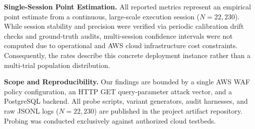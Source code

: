 \textbf{Single-Session Point Estimation.} All reported metrics represent an empirical point estimate from a continuous, large-scale execution session ($N=22{,}230$). While session stability and precision were verified via periodic calibration drift checks and ground-truth audits, multi-session confidence intervals were not computed due to operational and AWS cloud infrastructure cost constraints. Consequently, the rates describe this concrete deployment instance rather than a multi-trial population distribution.

\textbf{Scope and Reproducibility.} Our findings are bounded by a single AWS WAF policy configuration, an HTTP GET query-parameter attack vector, and a PostgreSQL backend. All probe scripts, variant generators, audit harnesses, and raw JSONL logs ($N=22{,}230$) are published in the project artifact repository. Probing was conducted exclusively against authorized cloud testbeds.
